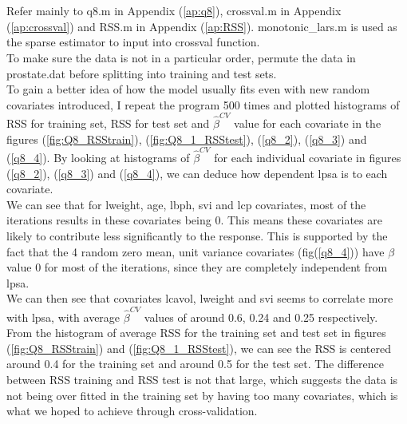 \documentclass{article}
\begin{document}
	\section{}
	Refer mainly to q8.m in Appendix (\ref{ap:q8}), crossval.m in Appendix (\ref{ap:crossval}) and RSS.m in Appendix (\ref{ap:RSS}).
	monotonic\_lars.m is used as the sparse estimator to input into crossval function.\\
	To make sure the data is not in a particular order, permute the data in prostate.dat before splitting into training and test sets.\\
	To gain a better idea of how the model usually fits even with new random covariates introduced, I repeat the program 500 times and plotted histograms of RSS for training set, RSS for test set and $ \hat{\beta}^{CV} $ value for each covariate in the figures (\ref{fig:Q8_RSStrain}), (\ref{fig:Q8_1_RSStest}), (\ref{q8_2}), (\ref{q8_3}) and (\ref{q8_4}).
	By looking at histograms of $ \hat{\beta}^{CV} $ for each individual covariate in figures (\ref{q8_2}), (\ref{q8_3}) and (\ref{q8_4}), we can deduce how dependent lpsa is to each covariate. \\
	We can see that for lweight, age, lbph, svi and lcp covariates, most of the iterations results in these covariates being 0. This means these covariates are likely to contribute less significantly to the response. This is supported by the fact that the 4 random zero mean, unit variance covariates (fig(\ref{q8_4})) have $ \beta $ value 0 for most of the iterations, since they are completely independent from lpsa.\\
	We can then see that covariates lcavol, lweight and svi seems to correlate more with lpsa, with average $ \hat{\beta}^{CV} $ values of around 0.6, 0.24 and 0.25 respectively.\\
	From the histogram of average RSS for the training set and test set in figures (\ref{fig:Q8_RSStrain}) and (\ref{fig:Q8_1_RSStest}), we can see the RSS is centered around 0.4 for the training set and around 0.5 for the test set. The difference between RSS training and RSS test is not that large, which suggests the data is not being over fitted in the training set by having too many covariates, which is what we hoped to achieve through cross-validation.
	
\end{document}
